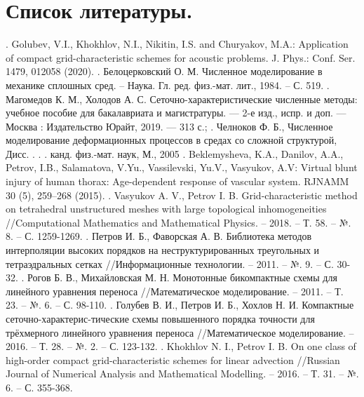 \documentclass[14pt]{article}
\begin{document}
\section*{Список литературы.}
. Golubev, V.I., Khokhlov, N.I., Nikitin, I.S. and Churyakov, M.A.: Application of compact grid-characteristic schemes for acoustic problems. J. Phys.: Conf. Ser. 1479, 012058 (2020).
. Белоцерковский О. М. Численное моделирование в механике сплошных сред. – Наука. Гл. ред. физ.-мат. лит., 1984. – С. 519. %
. \: Магомедов К. М., Холодов А. С. Сеточно-характеристические численные методы:  учебное пособие для бакалавриата и магистратуры. — 2-е изд., испр. и доп. — Москва : Издательство Юрайт, 2019. — 313 с.;
. \: Челноков Ф. Б., Численное моделирование деформационных процессов в средах со сложной структурой, Дисс. . . . канд. физ.-мат. наук, М., 2005
. \: Beklemysheva, K.A., Danilov, A.A., Petrov, I.B., Salamatova, V.Yu., Vassilevski, Yu.V., Vasyukov, A.V: Virtual blunt injury of human thorax: Age-dependent response of vascular system. RJNAMM 30 (5), 259–268 (2015).
. \: Vasyukov A. V., Petrov I. B. Grid-characteristic method on tetrahedral unstructured meshes with large topological inhomogeneities //Computational Mathematics and Mathematical Physics. – 2018. – Т. 58. – №. 8. – С. 1259-1269.
. \: Петров И. Б., Фаворская А. В. Библиотека методов интерполяции высоких порядков на неструктурированных треугольных и тетраэдральных сетках //Информационные технологии. – 2011. – №. 9. – С. 30-32.
. \: Рогов Б. В., Михайловская М. Н. Монотонные бикомпактные схемы для линейного уравнения переноса //Математическое моделирование. – 2011. – Т. 23. – №. 6. – С. 98-110. 
. \: Голубев В. И., Петров И. Б., Хохлов Н. И. Компактные сеточно-характерис-тические схемы повышенного порядка точности для трёхмерного линейного уравнения переноса //Математическое моделирование. – 2016. – Т. 28. – №. 2. – С. 123-132.
. \: Khokhlov N. I., Petrov I. B. On one class of high-order compact grid-characteristic schemes for linear advection //Russian Journal of Numerical Analysis and Mathematical Modelling. – 2016. – Т. 31. – №. 6. – С. 355-368.
\end{document}
